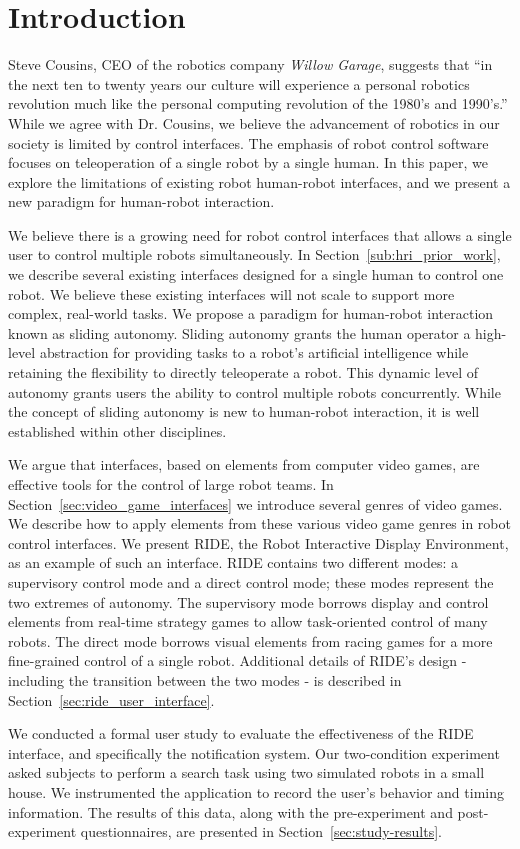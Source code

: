 \chapter{Introduction}
Steve Cousins, CEO of the robotics company \emph{Willow Garage}, suggests that ``in the next ten to twenty years our culture will experience a personal robotics revolution much like the personal computing revolution of the 1980's and 1990's.'' \cite{Cousins} While we agree with Dr. Cousins, we believe the advancement of robotics in our society is limited by control interfaces. The emphasis of robot control software focuses on teleoperation of a single robot by a single human. In this paper, we explore the limitations of existing robot human-robot interfaces, and we present a new paradigm for human-robot interaction.

We believe there is a growing need for robot control interfaces that allows a single user to control multiple robots simultaneously. In Section~\ref{sub:hri_prior_work}, we describe several existing interfaces designed for a single human to control one robot. We believe these existing interfaces will not scale to support more complex, real-world tasks. We propose a paradigm for human-robot interaction known as sliding autonomy. Sliding autonomy grants the human operator a high-level abstraction for providing tasks to a robot's artificial intelligence while retaining the flexibility to directly teleoperate a robot. This dynamic level of autonomy grants users the ability to control multiple robots concurrently. While the concept of sliding autonomy is new to human-robot interaction, it is well established within other disciplines.

We argue that interfaces, based on elements from computer video games, are effective tools for the control of large robot teams. In Section~\ref{sec:video_game_interfaces} we introduce several genres of video games. We describe how to apply elements from these various video game genres in robot control interfaces. We present RIDE, the Robot Interactive Display Environment, as an example of such an interface. RIDE contains two different modes: a supervisory control mode and a direct control mode; these modes represent the two extremes of autonomy. The supervisory mode borrows display and control elements from real-time strategy games to allow task-oriented control of many robots. The direct mode borrows visual elements from racing games for a more fine-grained control of a single robot. Additional details of RIDE's design - including the transition between the two modes - is described in Section~\ref{sec:ride_user_interface}.

We conducted a formal user study to evaluate the effectiveness of the RIDE interface, and specifically the notification system. Our two-condition experiment asked subjects to perform a search task using two simulated robots in a small house. We instrumented the application to record the user's behavior and timing information. The results of this data, along with the pre-experiment and post-experiment questionnaires, are presented in Section~\ref{sec:study-results}.
